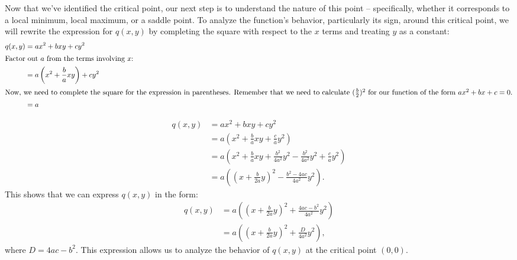 \documentclass{article}
\begin{document}
Now that we've identified the critical point, our next step is to understand the nature of this point – specifically, whether it corresponds to a local minimum, local maximum, or a saddle point. To analyze the function's behavior, particularly its sign, around this critical point, we will rewrite the expression for \( q(x, y) \) by completing the square with respect to the \(x\) terms and treating \(y\) as a constant:
\begin{align*}
    q(x, y) &= ax^2 + bxy + cy^2 \\
    \intertext{Factor out \(a\) from the terms involving \(x\):}
    &= a\left(x^2 + \frac{b}{a}xy\right) + cy^2 \\
    \intertext{Now, we need to complete the square for the expression in parentheses. Remember that we need to calculate \((\frac{b}{2})^{2}\) for our function of the form \(ax^{2} + bx + c = 0\).} 
    &= a
\end{align*}


\begin{align*}
    q(x, y) &= ax^2 + bxy + cy^2 \\
    &= a\left(x^2 + \frac{b}{a}xy + \frac{c}{a}y^2\right) \\
    &= a\left(x^2 + \frac{b}{a}xy + \frac{b^2}{4a^2}y^2 - \frac{b^2}{4a^2}y^2 + \frac{c}{a}y^2\right) \\
    &= a\left(\left(x + \frac{b}{2a}y\right)^2 - \frac{b^2 - 4ac}{4a^2}y^2\right).
\end{align*}
This shows that we can express \( q(x, y) \) in the form:
\begin{align*}
    q(x, y) &= a\left(\left(x + \frac{b}{2a}y\right)^2 + \frac{4ac - b^2}{4a^2}y^2\right) \\
    &= a\left(\left(x + \frac{b}{2a}y\right)^2 + \frac{D}{4a^2}y^2\right),
\end{align*}
where \( D = 4ac - b^2 \). This expression allows us to analyze the behavior of \( q(x, y) \) at the critical point \( (0, 0) \).
\end{document}
